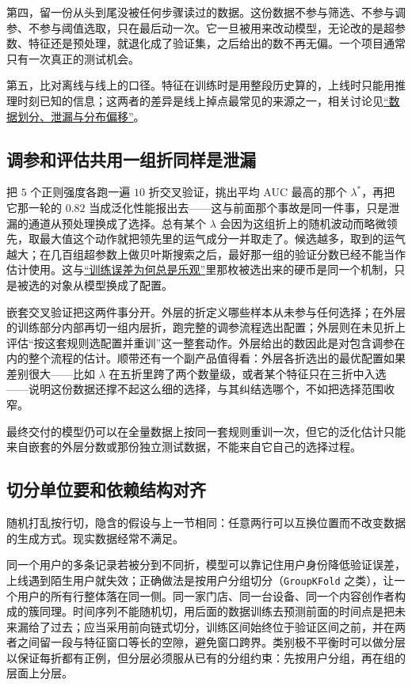 第四，留一份从头到尾没被任何步骤读过的数据。这份数据不参与筛选、不参与调参、不参与阈值选取，只在最后动一次。它一旦被用来改动模型，无论改的是超参数、特征还是预处理，就退化成了验证集，之后给出的数不再无偏。一个项目通常只有一次真正的测试机会。

第五，比对离线与线上的口径。特征在训练时是用整段历史算的，上线时只能用推理时刻已知的信息；这两者的差异是线上掉点最常见的来源之一，相关讨论见\hyperref[sec:13-Machine-Learning/01-Learning-Problems-and-Evaluation/04]{``数据划分、泄漏与分布偏移''}。

\subsection{调参和评估共用一组折同样是泄漏}

把 \(5\) 个正则强度各跑一遍 \(10\) 折交叉验证，挑出平均 AUC 最高的那个 \(\lambda^\ast\)，再把它那一轮的 \(0.82\) 当成泛化性能报出去——这与前面那个事故是同一件事，只是泄漏的通道从预处理换成了选择。总有某个 \(\lambda\) 会因为这组折上的随机波动而略微领先，取最大值这个动作就把领先里的运气成分一并取走了。候选越多，取到的运气越大；在几百组超参数上做贝叶斯搜索之后，最好那一组的验证分数已经不能当作估计使用。这与\hyperref[sec:13-Machine-Learning/10-Learning-Theory/01]{``训练误差为何总是乐观''}里那枚被选出来的硬币是同一个机制，只是被选的对象从模型换成了配置。

嵌套交叉验证把这两件事分开。外层的折定义哪些样本从未参与任何选择；在外层的训练部分内部再切一组内层折，跑完整的调参流程选出配置；外层则在未见折上评估``按这套规则选配置并重训''这一整套动作。外层给出的数因此是对包含调参在内的整个流程的估计。顺带还有一个副产品值得看：外层各折选出的最优配置如果差别很大——比如 \(\lambda\) 在五折里跨了两个数量级，或者某个特征只在三折中入选——说明这份数据还撑不起这么细的选择，与其纠结选哪个，不如把选择范围收窄。

最终交付的模型仍可以在全量数据上按同一套规则重训一次，但它的泛化估计只能来自嵌套的外层分数或那份独立测试数据，不能来自它自己的选择过程。

\subsection{切分单位要和依赖结构对齐}

随机打乱按行切，隐含的假设与上一节相同：任意两行可以互换位置而不改变数据的生成方式。现实数据经常不满足。

同一个用户的多条记录若被分到不同折，模型可以靠记住用户身份降低验证误差，上线遇到陌生用户就失效；正确做法是按用户分组切分（\texttt{GroupKFold} 之类），让一个用户的所有行整体落在同一侧。同一家门店、同一台设备、同一个内容创作者构成的簇同理。时间序列不能随机切，用后面的数据训练去预测前面的时间点是把未来漏给了过去；应当采用前向链式切分，训练区间始终位于验证区间之前，并在两者之间留一段与特征窗口等长的空隙，避免窗口跨界。类别极不平衡时可以做分层以保证每折都有正例，但分层必须服从已有的分组约束：先按用户分组，再在组的层面上分层。

